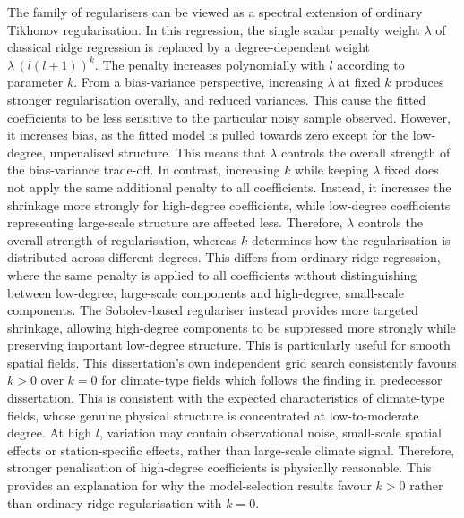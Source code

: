 The family of regularisers can be viewed as a spectral extension of ordinary Tikhonov regularisation. In this regression, the single scalar penalty weight $\lambda$ of classical ridge regression is replaced by a degree-dependent weight $\lambda\,(l(l+1))^k$. The penalty increases polynomially with $l$ according to parameter $k$. From a bias-variance perspective, increasing $\lambda$ at fixed $k$ produces stronger regularisation overally, and reduced variances. This cause the fitted coefficients to be less sensitive to the particular noisy sample observed. However, it increases bias, as the fitted model is pulled towards zero except for the low-degree, unpenalised structure. This means that $\lambda$ controls the overall strength of the bias-variance trade-off. In contrast, increasing $k$ while keeping $\lambda$ fixed does not apply the same additional penalty to all coefficients. Instead, it increases the shrinkage more strongly for high-degree coefficients, while low-degree coefficients representing large-scale structure are affected less. Therefore, $\lambda$ controls the overall strength of regularisation, whereas $k$ determines how the regularisation is distributed across different degrees. This differs from ordinary ridge regression, where the same penalty is applied to all coefficients without distinguishing between low-degree, large-scale components and high-degree, small-scale components. The Sobolev-based regulariser instead provides more targeted shrinkage, allowing high-degree components to be suppressed more strongly while preserving important low-degree structure. This is particularly useful for smooth spatial fields. This dissertation's own independent grid search consistently favours $k>0$ over $k=0$ for climate-type fields which follows the finding in predecessor dissertation. This is consistent with the expected characteristics of climate-type fields, whose genuine physical structure is concentrated at low-to-moderate degree. At high $l$, variation may contain observational noise, small-scale spatial effects or station-specific effects,  rather than large-scale climate signal. Therefore, stronger penalisation of high-degree coefficients is physically reasonable. This provides an explanation for why the model-selection results favour $k>0$ rather than ordinary ridge regularisation with $k=0$.

